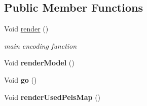 \subsection*{Public Member Functions}
\begin{DoxyCompactItemize}
\item 
Void \hyperlink{class_t_app_renderer_top_a0f9693638b0bb6fa40fdab529974cb80}{render} ()
\begin{DoxyCompactList}\small\item\em main encoding function \end{DoxyCompactList}\item 
\mbox{\label{class_t_app_renderer_top_ad7f92ae2fae2de4c45f59e38e03493fa}} 
Void {\bfseries render\+Model} ()
\item 
\mbox{\label{class_t_app_renderer_top_ad0f85dc94dce01a94bc68ce161d98261}} 
Void {\bfseries go} ()
\item 
\mbox{\label{class_t_app_renderer_top_a5571e70c841e08f4be10c2ee7ac56c39}} 
Void {\bfseries render\+Used\+Pels\+Map} ()
\end{DoxyCompactItemize}

